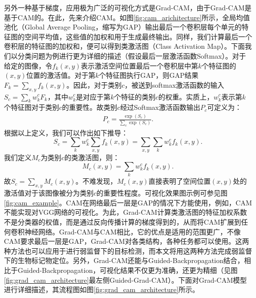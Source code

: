 另外一种基于梯度，应用极为广泛的可视化方式是Grad-CAM，由于Grad-CAM是基于CAM的。在此，先来介绍CAM。如图\ref{fig:cam_arichitecture}所示，全局均值池化（Global Average Pooling，缩写为GAP）输出最后一个卷积层每个单元的特征图的空间平均值，这些值的加权和用于生成最终输出。同样，我们计算最后一个卷积层的特征图的加权和，便可以得到类激活图（Class Activation Map）。下面我们以分类问题为例进行更为详细的描述（假设最后一层激活函数Softmax）。对于给定的图像，令$f_k(x, y)$表示激活空间位置最后一个卷积层中第$k$个特征图的$(x,y)$位置的激活值。对于第$k$个特征图执行GAP，则GAP结果$F_k=\sum_{x, y} f_{k}(x,y)$。因此，对于类别$c$，被送到softmax激活函数的输入$S_c=\sum_{k} w_{k}^{c} F_{k}$，其中$w_k^c$是对应于第$k$个特征的类别$c$的权重。实质上，$w_{k}^{c}$表示第$k$个特征图对于类别$c$的重要性。故类别$c$经过Softmax激活函数输出$P_c$可定义为：
\begin{eqnarray}
P_c=\frac{\exp \left(S_{c}\right)}{\sum_{c} \exp \left(S_{c}\right)}.
\end{eqnarray}
根据以上定义，我们可以作出如下推导： 
\begin{equation}
S_{c}=\sum_{k} w_{k}^{c} \sum_{x, y} f_{k}(x, y)=\sum_{x, y} \sum_{k} w_{k}^{c} f_{k}(x, y).
\end{equation}
我们定义$M_c$为类别$c$的类激活图，则：
\begin{equation}
M_{c}(x, y)=\sum_{k} w_{k}^{c} f_{k}(x, y).
\end{equation}
故$S_{c}=\sum_{x,y} M_{c}(x, y)$。不难发现，$M_{c}(x, y)$直接表明了空间位置$(x,y)$处的激活值对于该图像被分为类别$c$的重要性程度。可视化效果图示例可参见图\ref{fig:cam_example}。CAM在网络最后一层是GAP的情况下方能使用，例如，CAM不能实现对VGG网络的可视化。为此，Grad-CAM计算类激活图的特征加权系数不是分类器的权值，而是通过反向传播计算的梯度得到的，从而将CAM扩展到任何卷积神经网络。Grad-CAM与CAM相比，它的优点是适用的范围更广，不像CAM要求最后一层是GAP，Grad-CAM对各类结构，各种任务都可以使用。这两种方法也可以应用于进行弱监督下的目标检测，而本文将用这两种方法完成弱监督下的生物标记物定位。另外，Grad-CAM还能与Guided-Backpropagation结合，相比于Guided-Backpropagation，可视化结果不仅更为准确，还更为精细（见图\ref{fig:grad_cam_architecture}最左侧Guided-Grad-CAM）。下面对Grad-CAM模型进行详细描述，其流程图如图\ref{fig:grad_cam_architecture}所示。

